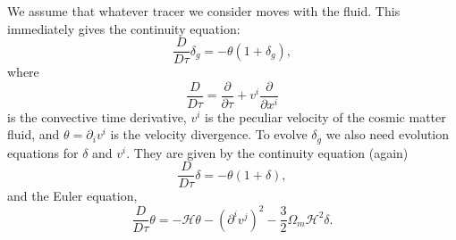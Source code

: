 \documentclass[11pt]{article}
\begin{document}
We assume that whatever tracer we consider moves with the fluid. This immediately gives the continuity equation:
\begin{equation}
    \frac{D}{D\tau}\delta_g = -\theta(1+\delta_g),
    \label{eq:conteqtracer}
\end{equation}
where
\begin{equation}
    \frac{D}{D\tau} = \frac{\partial}{\partial \tau} + v^i\frac{\partial}{\partial x^i}
\end{equation}
is the convective time derivative, $v^i$ is the peculiar velocity of the cosmic matter fluid, and $\theta=\partial_i v^i$ is the velocity divergence. %
To evolve $\delta_g$ we also need evolution equations for $\delta$ and $v^i$. They are given by the continuity equation (again)
\begin{equation}
    \frac{D}{D\tau}\delta = -\theta(1+\delta),
    \label{eq:conteq}
\end{equation}
and the Euler equation,
\begin{equation}
    \frac{D}{D\tau}\theta = -\mathcal H \theta - (\partial^iv^j)^2 - \frac{3}{2}\Omega_m\mathcal H^2\delta.
\end{equation}
\end{document}
